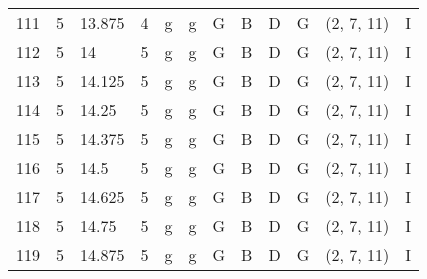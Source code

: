 \begin{tabular}{llllllllllll}
111 & 5       & 13.875 & 4               & g          & g              & G      & B       & D      & G         & (2, 7, 11)       & I              \\
112 & 5       & 14     & 5               & g          & g              & G      & B       & D      & G         & (2, 7, 11)       & I              \\
113 & 5       & 14.125 & 5               & g          & g              & G      & B       & D      & G         & (2, 7, 11)       & I              \\
114 & 5       & 14.25  & 5               & g          & g              & G      & B       & D      & G         & (2, 7, 11)       & I              \\
115 & 5       & 14.375 & 5               & g          & g              & G      & B       & D      & G         & (2, 7, 11)       & I              \\
116 & 5       & 14.5   & 5               & g          & g              & G      & B       & D      & G         & (2, 7, 11)       & I              \\
117 & 5       & 14.625 & 5               & g          & g              & G      & B       & D      & G         & (2, 7, 11)       & I              \\
118 & 5       & 14.75  & 5               & g          & g              & G      & B       & D      & G         & (2, 7, 11)       & I              \\
119 & 5       & 14.875 & 5               & g          & g              & G      & B       & D      & G         & (2, 7, 11)       & I             
\end{tabular}
